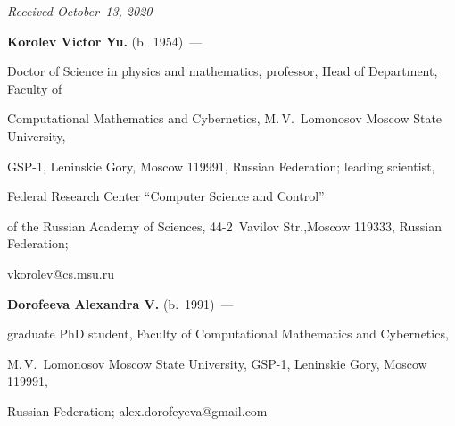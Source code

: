 \vspace*{-3pt}



  \hfill{\small\textit{Received October~13, 2020}}











\Contr



\noindent

\textbf{Korolev Victor Yu.} (b.\ 1954)~--- 

Doctor of Science in physics and mathematics, professor, Head of Department, Faculty of 

Computational Mathematics and Cybernetics, M.\,V.~Lomonosov Moscow State University, 

GSP-1, Leninskie Gory, Moscow 119991, Russian Federation; leading scientist, 

Federal Research Center ``Computer Science and Control'' 

of the Russian Academy of Sciences, 44-2~Vavilov Str.,Moscow 119333, Russian Federation; 

\mbox{vkorolev@cs.msu.ru}



\vspace*{6pt}



\noindent

\textbf{Dorofeeva Alexandra V.} (b.\ 1991)~--- 

graduate PhD student, Faculty of Computational Mathematics and Cybernetics, 

M.\,V.~Lomonosov Moscow State University, GSP-1, Leninskie Gory, Moscow 119991, 

Russian Federation; \mbox{alex.dorofeyeva@gmail.com}



\label{end\stat}



\renewcommand{\bibname}{\protect\rm Литература}

